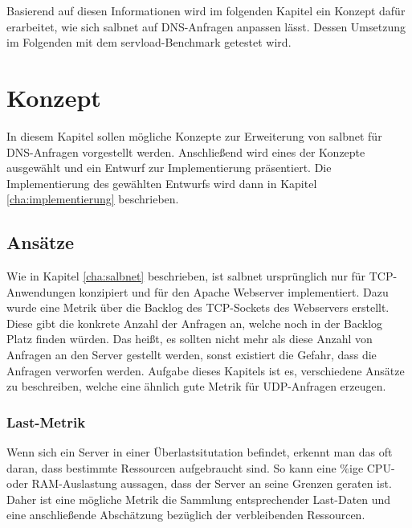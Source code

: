 \documentclass[a4paper, 12pt, BCOR10mm, DIV12, toc=bibliography, toc=listof, german]{scrbook}
\begin{document}
			Basierend auf diesen Informationen wird im folgenden Kapitel ein Konzept dafür erarbeitet, wie
			sich salbnet auf DNS-Anfragen anpassen lässt.  Dessen Umsetzung im Folgenden mit dem
			servload-Benchmark getestet wird.



	\chapter{Konzept} %
	\label{cha:konzept}

	In diesem Kapitel sollen mögliche Konzepte zur Erweiterung von salbnet für DNS-Anfragen
	vorgestellt werden. Anschließend wird eines der Konzepte ausgewählt und ein Entwurf zur Implementierung
	präsentiert. Die Implementierung des gewählten Entwurfs wird dann in Kapitel
	\ref{cha:implementierung} beschrieben.

		\section{Ansätze} %
		\label{sec:ansaetze}

		Wie in Kapitel \ref{cha:salbnet} beschrieben, ist salbnet ursprünglich nur für TCP-Anwendungen
		konzipiert und für den Apache Webserver implementiert. Dazu wurde eine Metrik über die Backlog
		des TCP-Sockets des Webservers erstellt. Diese gibt die konkrete Anzahl der Anfragen an, welche
		noch in der Backlog Platz finden würden. Das heißt, es sollten nicht mehr als diese Anzahl von
		Anfragen an den Server gestellt werden, sonst existiert die Gefahr, dass die Anfragen verworfen
		werden. Aufgabe dieses Kapitels ist es, verschiedene Ansätze zu beschreiben, welche eine ähnlich
		gute Metrik für UDP-Anfragen erzeugen.

		\subsection*{Last-Metrik} %

		Wenn sich ein Server in einer Überlastsitutation befindet, erkennt man das oft daran, dass
		bestimmte Ressourcen aufgebraucht sind. So kann eine \unit[100]{\%}ige CPU- oder RAM-Auslastung aussagen,
		dass der Server an seine Grenzen geraten ist. Daher ist eine mögliche Metrik die Sammlung
		entsprechender Last-Daten und eine anschließende Abschätzung bezüglich der verbleibenden
		Ressourcen.
		
\end{document}
